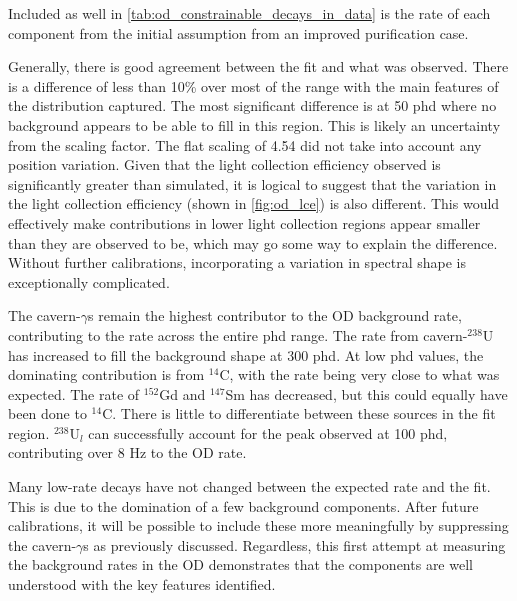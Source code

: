 Included as well in \autoref{tab:od_constrainable_decays_in_data} is the rate of each component from the initial assumption from an improved purification case.
\par
Generally, there is good agreement between the fit and what was observed.
There is a difference of less than 10\% over most of the range with the main features of the distribution captured.
The most significant difference is at 50 phd where no background appears to be able to fill in this region.
This is likely an uncertainty from the scaling factor.
The flat scaling of 4.54 did not take into account any position variation.
Given that the light collection efficiency observed is significantly greater than simulated, it is logical to suggest that the variation in the light collection efficiency (shown in \autoref{fig:od_lce}) is also different.
This would effectively make contributions in lower light collection regions appear smaller than they are observed to be, which may go some way to explain the difference.
Without further calibrations, incorporating a variation in spectral shape is exceptionally complicated.
\par
The cavern-$\gamma$s remain the highest contributor to the OD background rate, contributing to the rate across the entire phd range.
The rate from cavern-${}^{238}$U has increased to fill the background shape at 300 phd.
At low phd values, the dominating contribution is from ${}^{14}$C, with the rate being very close to what was expected.
The rate of ${}^{152}$Gd and ${}^{147}$Sm has decreased, but this could equally have been done to ${}^{14}$C.
There is little to differentiate between these sources in the fit region.
${}^{238}$U$_l$ can successfully account for the peak observed at 100 phd, contributing over 8 Hz to the OD rate.
\par
Many low-rate decays have not changed between the expected rate and the fit.
This is due to the domination of a few background components.
After future calibrations, it will be possible to include these more meaningfully by suppressing the cavern-$\gamma$s as previously discussed.
Regardless, this first attempt at measuring the background rates in the OD demonstrates that the components are well understood with the key features identified.




